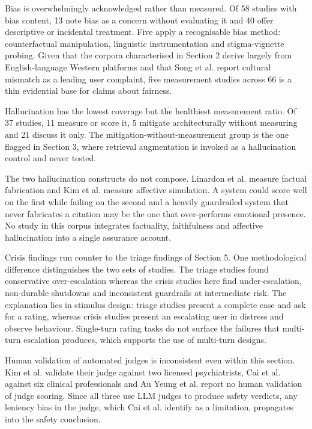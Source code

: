 \documentclass[11pt]{article}
\begin{document}
	Bias is overwhelmingly acknowledged rather than measured. Of 58 studies with bias content, 13 note bias as a concern without evaluating it and 40 offer descriptive or incidental treatment. Five apply a recognisable bias method: counterfactual manipulation, linguistic instrumentation and stigma-vignette probing. Given that the corpora characterised in Section 2 derive largely from English-language Western platforms and that Song et al. report cultural mismatch as a leading user complaint, five measurement studies across 66 is a thin evidential base for claims about fairness.
	
	Hallucination has the lowest coverage but the healthiest measurement ratio. Of 37 studies, 11 measure or score it, 5 mitigate architecturally without measuring and 21 discuss it only. The mitigation-without-measurement group is the one flagged in Section 3, where retrieval augmentation is invoked as a hallucination control and never tested.
	
	The two hallucination constructs do not compose. Linardon et al. measure factual fabrication and Kim et al.\cite{kim-etal-2026-kind} measure affective simulation. A system could score well on the first while failing on the second and a heavily guardrailed system that never fabricates a citation may be the one that over-performs emotional presence. No study in this corpus integrates factuality, faithfulness and affective hallucination into a single assurance account.
	
	Crisis findings run counter to the triage findings of Section 5. One methodological difference distinguishes the two sets of studies. The triage studies found conservative over-escalation whereas the crisis studies here find under-escalation, non-durable shutdowns and inconsistent guardrails at intermediate risk. The explanation lies in stimulus design: triage studies present a complete case and ask for a rating, whereas crisis studies present an escalating user in distress and observe behaviour. Single-turn rating tasks do not surface the failures that multi-turn escalation produces, which supports the use of multi-turn designs.
	
	Human validation of automated judges is inconsistent even within this section. Kim et al.\cite{kim-etal-2026-kind} validate their judge against two licensed psychiatrists, Cai et al. against six clinical professionals and Au Yeung et al. report no human validation of judge scoring. Since all three use LLM judges to produce safety verdicts, any leniency bias in the judge, which Cai et al. identify as a limitation, propagates into the safety conclusion.
	
\end{document}

